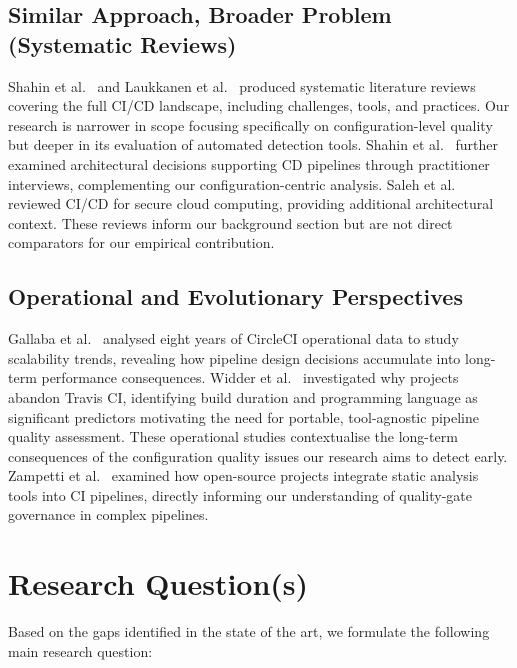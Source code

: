 \documentclass[12pt, a4paper]{article}
\begin{document}
\subsection{Similar Approach, Broader Problem (Systematic Reviews)}

Shahin et al.~\cite{shahin2017a} and Laukkanen et al.~\cite{laukkanen2017} produced
systematic literature reviews covering the full CI/CD landscape, including challenges,
tools, and practices. Our research is narrower in scope focusing specifically on
configuration-level quality but deeper in its evaluation of automated detection
tools. Shahin et al.~\cite{shahin2019} further examined architectural decisions
supporting CD pipelines through practitioner interviews, complementing our
configuration-centric analysis. Saleh et al.~\cite{saleh2024} reviewed CI/CD for
secure cloud computing, providing additional architectural context. These reviews
inform our background section but are not direct comparators for our empirical
contribution.

\subsection{Operational and Evolutionary Perspectives}

Gallaba et al.~\cite{gallaba2022} analysed eight years of CircleCI operational data
to study scalability trends, revealing how pipeline design decisions accumulate into
long-term performance consequences. Widder et al.~\cite{widder2018} investigated why
projects abandon Travis CI, identifying build duration and programming language as
significant predictors motivating the need for portable, tool-agnostic pipeline
quality assessment. These operational studies contextualise the long-term consequences
of the configuration quality issues our research aims to detect early. Zampetti et
al.~\cite{zampetti2017b} examined how open-source projects integrate static analysis
tools into CI pipelines, directly informing our understanding of quality-gate
governance in complex pipelines.

\section{Research Question(s)}

Based on the gaps identified in the state of the art, we formulate the following
main research question:
\end{document}

